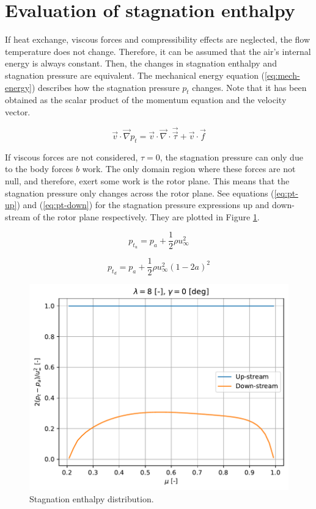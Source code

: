 \section{Evaluation of stagnation enthalpy }

If heat exchange, viscous forces and compressibility effects are neglected, the flow temperature does not change. Therefore, it can be assumed that the air's internal energy is always constant. Then, the changes in stagnation enthalpy and stagnation pressure are equivalent. The mechanical energy equation (\ref{eq:mech-energy}) describes how the stagnation pressure $ p_t $ changes. Note that it has been obtained as the scalar product of the momentum equation and the velocity vector.

\begin{equation}
	\vec{v} \cdot \vec{\nabla} p_t = \vec{v} \cdot \vec{\nabla} \cdot \vec{\vec{\tau}} + \vec{v} \cdot \vec{f}
	\label{eq:mech-energy}
\end{equation}

If viscous forces are not considered, $ \tau = 0 $, the stagnation pressure can only due to the body forces $ b $ work. The only domain region where these forces are not null, and therefore, exert some work is the rotor plane. This means that the stagnation pressure only changes across the rotor plane. See equations (\ref{eq:pt-up}) and (\ref{eq:pt-down}) for the stagnation pressure expressions up and down-stream of the rotor plane respectively. They are plotted in Figure \ref{img:pt}.

\begin{equation}
	p_{t_u} = p_a + \frac{1}{2} \rho u_{\infty}^2
	\label{eq:pt-up}
\end{equation}

\begin{equation}
	p_{t_d} = p_a + \frac{1}{2} \rho u_{\infty}^2 (1-2a)^2
	\label{eq:pt-down}
\end{equation}

\begin{figure}[htbp]
	\centering
	\includegraphics[height=0.45\textheight]{./img/stagnation-enthalpy.pdf}
	\caption{Stagnation enthalpy distribution.}
	\label{img:pt}
\end{figure}

